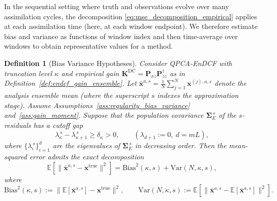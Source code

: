 \documentclass[11pt,a4paper]{article}
\newtheorem{definition}{Definition}
\begin{document}
In the sequential setting where truth and observations evolve over many assimilation cycles, the decomposition \eqref{eq:mse_decomposition_empirical} applies at each assimilation time (here, at each window endpoint). We therefore estimate bias and variance as functions of window index and then time-average over windows to obtain representative values for a method.
\begin{definition}[Bias Variance Hypotheses]
\label{def:bias_variance_hypotheses}
Consider QPCA-EnDCF with truncation level $\kappa$ and empirical gain
$\mathbf{K}^{\mathrm{DC}}=\mathbf{P}_{xz}\mathbf{P}_{zz}^{\dagger}$ as in Definition~\ref{def:endcf_gain_ensemble}. Let
\(
\bar{\mathbf{x}}^{a,s}=\frac{1}{N}\sum_{j=1}^N\mathbf{x}^{(j),a,s}
\)
denote the analysis ensemble mean (where the superscript $s$ indexes the approximation stage). Assume Assumptions~\ref{ass:regularity_bias_variance} and~\ref{ass:gain_moment}. Suppose that the population covariance $\boldsymbol{\Sigma}_E^{\,s}$ of the $s$-residuals has a cutoff gap
\begin{equation}
\label{eq:gap_cutoff_bv}
\lambda_\kappa^{\,s}-\lambda_{\kappa+1}^{\,s}\ge \delta_\kappa>0,
\qquad (\lambda_{d+1}:=0,\ d=mL),
\end{equation}
where $\{\lambda_i^{\,s}\}_{i=1}^d$ are the eigenvalues of $\boldsymbol{\Sigma}_E^{\,s}$ in decreasing order.
Then the mean-squared error admits the exact decomposition
\begin{equation}
\mathbb{E}\!\left[\|\bar{\mathbf{x}}^{a,s}-\mathbf{x}^{\mathrm{true}}\|^2\right]
=
\mathrm{Bias}^2(\kappa,s)+\mathrm{Var}(N,\kappa,s),
\end{equation}
where
\begin{equation}
\mathrm{Bias}^2(\kappa,s):=\bigl\|\mathbb{E}[\bar{\mathbf{x}}^{a,s}]-\mathbf{x}^{\mathrm{true}}\bigr\|^2,
\qquad
\mathrm{Var}(N,\kappa,s):=\mathbb{E}\!\left[\|\bar{\mathbf{x}}^{a,s}-\mathbb{E}[\bar{\mathbf{x}}^{a,s}]\|^2\right].
\end{equation}

\end{definition}
\end{document}
